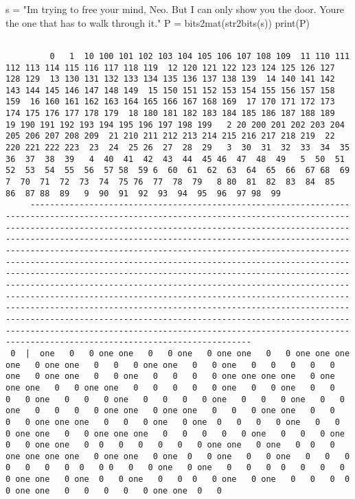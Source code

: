 \documentclass[
  letterpaper,
  DIV=11,
  numbers=noendperiod]{scrartcl}
\newenvironment{Shaded}{\begin{snugshade}}{\end{snugshade}}
\newcommand{\BuiltInTok}[1]{\textcolor[rgb]{0.00,0.23,0.31}{#1}}
\newcommand{\NormalTok}[1]{\textcolor[rgb]{0.00,0.23,0.31}{#1}}
\newcommand{\OperatorTok}[1]{\textcolor[rgb]{0.37,0.37,0.37}{#1}}
\newcommand{\StringTok}[1]{\textcolor[rgb]{0.13,0.47,0.30}{#1}}
\begin{document}
\begin{Shaded}
\begin{Highlighting}[numbers=left,,]
\NormalTok{s }\OperatorTok{=} \StringTok{"I\textquotesingle{}m trying to free your mind, Neo. But I can only show you the door. You\textquotesingle{}re the one that has to walk through it."}
\NormalTok{P }\OperatorTok{=}\NormalTok{ bits2mat(str2bits(s))}
\BuiltInTok{print}\NormalTok{(P) }
\end{Highlighting}
\end{Shaded}

\begin{lstlisting}

         0   1  10 100 101 102 103 104 105 106 107 108 109  11 110 111 112 113 114 115 116 117 118 119  12 120 121 122 123 124 125 126 127 128 129  13 130 131 132 133 134 135 136 137 138 139  14 140 141 142 143 144 145 146 147 148 149  15 150 151 152 153 154 155 156 157 158 159  16 160 161 162 163 164 165 166 167 168 169  17 170 171 172 173 174 175 176 177 178 179  18 180 181 182 183 184 185 186 187 188 189  19 190 191 192 193 194 195 196 197 198 199   2 20 200 201 202 203 204 205 206 207 208 209  21 210 211 212 213 214 215 216 217 218 219  22 220 221 222 223  23  24  25 26  27  28  29   3  30  31  32  33  34  35 36  37  38  39   4  40  41  42  43  44  45 46  47  48  49   5  50  51  52  53  54  55  56  57 58  59 6  60  61  62  63  64  65  66  67 68  69   7  70  71  72  73  74  75 76  77  78  79   8 80  81  82  83  84  85  86  87 88  89   9  90  91  92  93  94  95  96  97 98  99
     ---------------------------------------------------------------------------------------------------------------------------------------------------------------------------------------------------------------------------------------------------------------------------------------------------------------------------------------------------------------------------------------------------------------------------------------------------------------------------------------------------------------------------------------------------------------------------------------------------------------------------------------------------------------------------------------------------------------------------------------------------------------------------------------------------------------------------------------------------------------------------------------------------------------------
 0  |  one   0   0 one one   0   0 one   0 one one   0   0 one one one one   0 one one   0   0   0 one one   0   0 one   0   0   0   0   0 one   0 one one   0   0 one   0   0   0   0 one one one one   0 one one one   0   0 one one   0   0   0   0   0 one   0   0 one   0   0   0   0 one   0   0   0 one   0   0   0   0 one   0   0   0 one   0   0 one   0   0   0   0 one one   0 one one   0   0   0 one one   0   0   0   0 one one one   0   0   0 one   0 one  0   0   0   0 one   0   0   0 one one   0   0 one one one   0   0   0   0   0 one   0   0   0 one   0   0 one one   0  0   0   0   0   0   0 one one   0 one   0  0   0 one one one one   0 one one   0 one  0   0 one   0   0 one   0   0   0   0   0   0   0  0   0 0   0   0 one   0 one   0   0   0  0   0   0   0   0 one one   0 one  0   0 one   0   0  0   0 one   0 one   0   0   0  0   0 one one   0   0   0   0   0 one one  0   0

\end{lstlisting}
\end{document}
